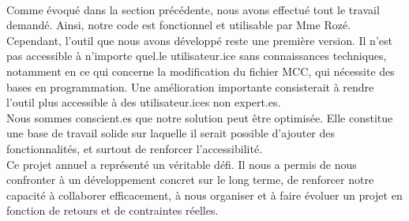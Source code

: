 \\
Comme évoqué dans la section précédente, nous avons effectué tout le travail demandé.
Ainsi, notre code est fonctionnel et utilisable par Mme Rozé. 
\\
Cependant, l'outil que nous avons développé reste une première version.
Il n’est pas accessible à n’importe quel.le utilisateur.ice sans connaissances techniques, notamment en ce qui concerne la modification du fichier MCC, qui nécessite des bases en programmation. 
Une amélioration importante consisterait à rendre l’outil plus accessible à des utilisateur.ices non expert.es.
\\
Nous sommes conscient.es que notre solution peut être optimisée.
Elle constitue une base de travail solide sur laquelle il serait possible d’ajouter des fonctionnalités, et surtout de renforcer l’accessibilité.
\\
Ce projet annuel a représenté un véritable défi. 
Il nous a permis de nous confronter à un développement concret sur le long terme, de renforcer notre capacité à collaborer efficacement, à nous organiser et à faire évoluer un projet en fonction de retours et de contraintes réelles.
